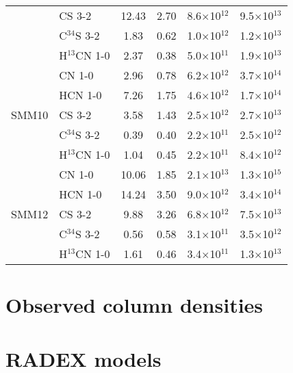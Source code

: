 \documentclass{aa}
\begin{document}
\begin{appendix}
\begin{table*}
\begin{tabular}{l l c c c c}
       {} & CS 3-2 & 12.43 & 2.70 & 8.6$\times$10$^{12}$ & 9.5$\times$10$^{13}$\\ 
       {} & C$^{34}$S 3-2 & 1.83 & 0.62 & 1.0$\times$10$^{12}$ & 1.2$\times$10$^{13}$ \\
        {} & H$^{13}$CN 1-0 & 2.37 & 0.38 & 5.0$\times$10$^{11}$ & 1.9$\times$10$^{13}$ \\ 
        \hline \multirow{5}{*}{SMM10} & CN 1-0 & 2.96 & 0.78 & 6.2$\times$10$^{12}$ & 3.7$\times$10$^{14}$\\ 
        {} & HCN 1-0 & 7.26 & 1.75 & 4.6$\times$10$^{12}$ & 1.7$\times$10$^{14}$\\
         {} & CS 3-2 & 3.58 & 1.43 & 2.5$\times$10$^{12}$ & 2.7$\times$10$^{13}$ \\ 
         {} & C$^{34}$S 3-2 & 0.39 & 0.40 & 2.2$\times$10$^{11}$ & 2.5$\times$10$^{12}$ \\ 
         {} & H$^{13}$CN 1-0 & 1.04 & 0.45 & 2.2$\times$10$^{11}$ & 8.4$\times$10$^{12}$\\ 
         \hline \multirow{5}{*}{SMM12} & CN 1-0 & 10.06 & 1.85 & 2.1$\times$10$^{13}$ & 1.3$\times$10$^{15}$\\
          {} & HCN 1-0 & 14.24 & 3.50 & 9.0$\times$10$^{12}$ & 3.4$\times$10$^{14}$\\ 
          {} & CS 3-2 & 9.88 & 3.26 & 6.8$\times$10$^{12}$ & 7.5$\times$10$^{13}$\\
           {} & C$^{34}$S 3-2 & 0.56 & 0.58 & 3.1$\times$10$^{11}$ & 3.5$\times$10$^{12}$\\ 
           {} & H$^{13}$CN 1-0 & 1.61 & 0.46 & 3.4$\times$10$^{11}$ & 1.3$\times$10$^{13}$\\ 
           \hline 
           \end{tabular}
           \end{table*}

\section{Observed column densities}

\section{RADEX models}


\end{appendix}
\end{document}
